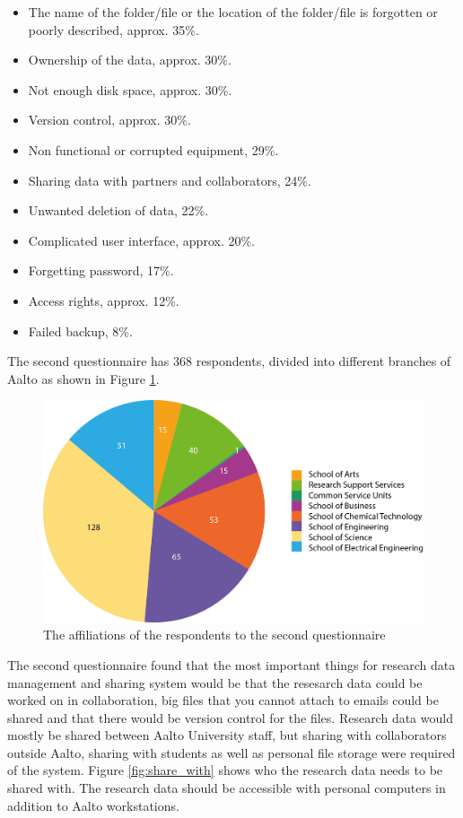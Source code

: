 \begin{itemize}
    \item The name of the folder/file or the location of the folder/file is
          forgotten or poorly described, approx. 35\%.
    \item Ownership of the data, approx. 30\%.
    \item Not enough disk space, approx. 30\%.
    \item Version control, approx. 30\%.
    \item Non functional or corrupted equipment, 29\%.
    \item Sharing data with partners and collaborators, 24\%.
    \item Unwanted deletion of data, 22\%.
    \item Complicated user interface, approx. 20\%.
    \item Forgetting password, 17\%.
    \item Access rights, approx. 12\%.
    \item Failed backup, 8\%.
\end{itemize}

The second questionnaire \cite{survey2} has 368 respondents, divided into different branches
of Aalto as shown in Figure \ref{fig:answers_branches}.


\begin{figure}
    \begin{centering}
        \includegraphics[width=\textwidth]{images/answers_branches2}
    \end{centering}
    \caption{The affiliations of the respondents to the second questionnaire}
    \label{fig:answers_branches}
\end{figure}

The second questionnaire found that the most important things for research data
management and sharing system would be that the resesarch data
could be worked on in collaboration, big files that you cannot attach to
emails could be shared and that there would be version control for the files.
Research data would mostly be shared between Aalto University staff, but
sharing with collaborators outside Aalto, sharing with students as well as
personal file storage were required of the system. Figure \ref{fig:share_with}
shows who the research data needs to be shared with. The research data should be
accessible with personal computers in addition to Aalto workstations.

